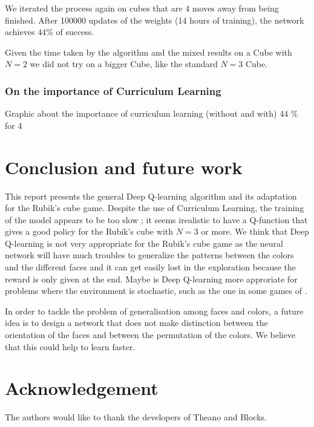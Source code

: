 \documentclass{article} %
\begin{document}
We iterated the process again on cubes that are 4 moves away from being finished. After 100000 updates of the weights (14 hours of training), the network achieves $44$\% of success.

Given the time taken by the algorithm and the mixed results on a Cube with $N=2$ we did not try on a bigger Cube, like the standard $N=3$ Cube. 

\subsubsection{On the importance of Curriculum Learning}
Graphic about the importance of curriculum learning (without and with)
44 \% for 4

\section{Conclusion and future work}
This report presents the general Deep Q-learning algorithm and its adaptation for the Rubik's cube game. Despite the use of Curriculum Learning, the training of the model appears to be too slow ; it seems irealistic to have a Q-function that gives a good policy for the Rubik's cube with $N=3$ or more. We think that Deep Q-learning is not very appropriate for the Rubik's cube game as the neural network will have much troubles to generalize the patterns between the colors and the different faces and it can get easily lost in the exploration because the reward is only given at the end. Maybe is Deep Q-learning more approriate for problems where the environment is stochastic, such as the one in some games of \cite{deepmind}.

In order to tackle the problem of generalisation among faces and colors, a future idea is to design a network that does not make distinction between the orientation of the faces and between the permutation of the colors. We believe that this could help to learn faster.

\section{Acknowledgement}
The authors would like to thank the developers of Theano and Blocks.




\end{document}
